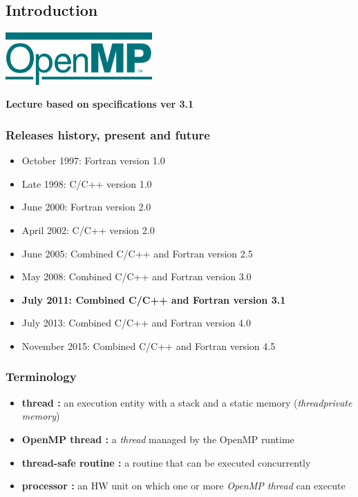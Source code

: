	\subsection{Introduction}


\begin{frame}
  \begin{center}
    {\includegraphics[height=2cm]{Day1/images/logo_OpenMP.png}}

    \textbf{Lecture based on specifications ver 3.1}

  \end{center}
\end{frame}

\begin{frame}
  \frametitle{Releases history, present and future}
  \begin{itemize}
  \item{October 1997: Fortran version 1.0 }
  \item{Late 1998: C/C++ version 1.0 }
  \item{June 2000: Fortran version 2.0 }
  \item{April 2002: C/C++ version 2.0 }
  \item{June 2005: Combined C/C++ and Fortran version 2.5 }
  \item{May 2008: Combined C/C++ and Fortran version  3.0}
  \item{\textbf{July 2011: Combined C/C++ and Fortran version  3.1}}
  \item{July 2013: Combined C/C++ and Fortran version 4.0 }
  \item{November 2015: Combined C/C++ and Fortran version 4.5 }
  \end{itemize}
\end{frame}


\begin{frame}
  \frametitle{Terminology}
  \begin{itemize}
  \item{\textbf{thread :} an execution entity with a stack and a static memory (\textit{threadprivate memory})}
  \item{\textbf{OpenMP thread :} a \textit{thread} managed by the OpenMP runtime}
  \item{\textbf{thread-safe routine :} a routine that can be executed concurrently}
  \item{\textbf{processor :} an HW unit on which one or more \textit{OpenMP thread} can execute}
  \end{itemize}
\end{frame}

